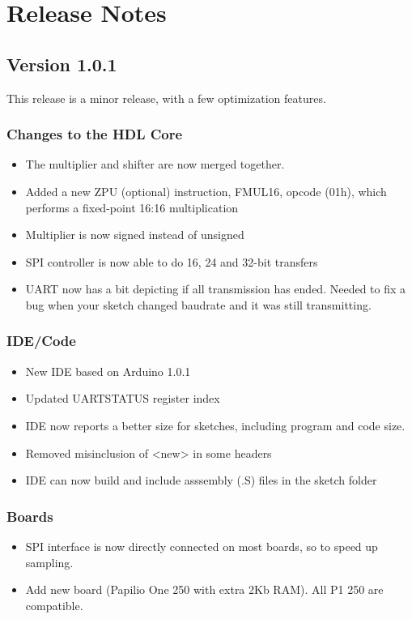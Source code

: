 \chapter{Release Notes}

\section*{Version 1.0.1}

This release is a minor release, with a few optimization features.

\subsection*{Changes to the HDL Core}
\begin{itemize}
\item The multiplier and shifter are now merged together.
\item Added a new ZPU (optional) instruction, FMUL16, opcode (01h), which performs a fixed-point 16:16 multiplication
\item Multiplier is now signed instead of unsigned
\item SPI controller is now able to do 16, 24 and 32-bit transfers
\item UART now has a bit depicting if all transmission has ended. Needed to fix a bug when your sketch changed baudrate and it was still transmitting.
\end{itemize}

\subsection*{IDE/Code}
\begin{itemize}
\item New IDE based on Arduino 1.0.1
\item Updated UARTSTATUS register index
\item IDE now reports a better size for sketches, including program and code size.
\item Removed misinclusion of <new> in some headers
\item IDE can now build and include asssembly (.S) files in the sketch folder
\end{itemize}

\subsection*{Boards}
\begin{itemize}
\item SPI interface is now directly connected on most boards, so to speed up sampling.
\item Add new board (Papilio One 250 with extra 2Kb RAM). All P1 250 are compatible.
\end{itemize}

